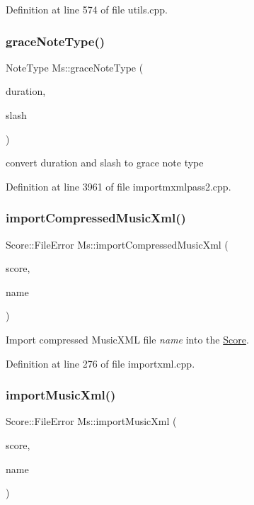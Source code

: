 Definition at line 574 of file utils.\+cpp.

\mbox{\label{namespace_ms_a908ed99fa32e69b3a26094a7809abf99}} 
\subsubsection{\texorpdfstring{grace\+Note\+Type()}{graceNoteType()}}
{\footnotesize\ttfamily Note\+Type Ms\+::grace\+Note\+Type (\begin{DoxyParamCaption}\item[{const \hyperlink{class_ms_1_1_t_duration}{T\+Duration}}]{duration,  }\item[{const bool}]{slash }\end{DoxyParamCaption})}

convert duration and slash to grace note type 

Definition at line 3961 of file importmxmlpass2.\+cpp.

\mbox{\label{namespace_ms_a786f5bc8eda1bad75051e33cab434d34}} 
\subsubsection{\texorpdfstring{import\+Compressed\+Music\+Xml()}{importCompressedMusicXml()}}
{\footnotesize\ttfamily Score\+::\+File\+Error Ms\+::import\+Compressed\+Music\+Xml (\begin{DoxyParamCaption}\item[{\hyperlink{class_ms_1_1_master_score}{Master\+Score} $\ast$}]{score,  }\item[{const Q\+String \&}]{name }\end{DoxyParamCaption})}

Import compressed Music\+X\+ML file {\itshape name} into the \hyperlink{class_ms_1_1_score}{Score}. 

Definition at line 276 of file importxml.\+cpp.

\mbox{\label{namespace_ms_a017abe227798d829fe2a344114740ff7}} 
\subsubsection{\texorpdfstring{import\+Music\+Xml()}{importMusicXml()}}
{\footnotesize\ttfamily Score\+::\+File\+Error Ms\+::import\+Music\+Xml (\begin{DoxyParamCaption}\item[{\hyperlink{class_ms_1_1_master_score}{Master\+Score} $\ast$}]{score,  }\item[{const Q\+String \&}]{name }\end{DoxyParamCaption})}

